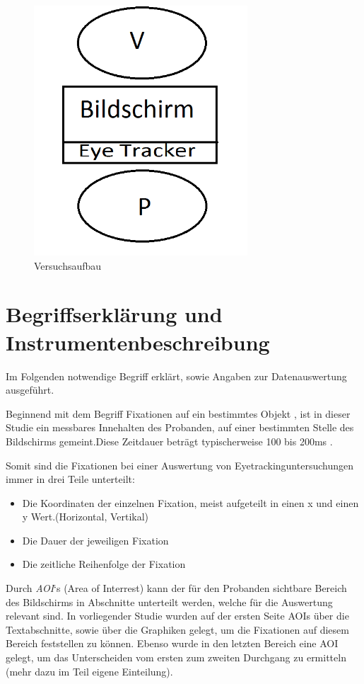 \begin{figure}[H]
\noindent\hspace{0.5mm}\includegraphics[width=8cm]{./Ressourcen/Versuchsaufbau.png}
\caption{Versuchsaufbau}
\end{figure}

\section{Begriffserklärung und Instrumentenbeschreibung}
Im Folgenden notwendige Begriff erklärt, sowie Angaben zur Datenauswertung ausgeführt.


Beginnend mit dem Begriff \grqq Fixationen auf ein bestimmtes Objekt \grqq, ist in dieser Studie ein messbares Innehalten des Probanden, auf einer bestimmten Stelle des Bildschirms gemeint.\grqq Diese Zeitdauer beträgt typischerweise 100 bis 200ms\cite{EyetrackingFixation} .\grqq

Somit sind die Fixationen bei einer Auswertung von Eyetrackinguntersuchungen immer in drei Teile unterteilt:
    \begin{itemize}
        \item Die Koordinaten der einzelnen Fixation, meist aufgeteilt in einen x und einen y Wert.(Horizontal, Vertikal)
        \item Die Dauer der jeweiligen Fixation
        \item Die zeitliche Reihenfolge der Fixation
    \end{itemize}


Durch \textit{AOI}`s (\grqq Area of Interrest\grqq) kann der für den Probanden sichtbare Bereich des Bildschirms in Abschnitte unterteilt werden, welche für die Auswertung relevant sind. In vorliegender Studie wurden auf der ersten Seite AOIs über die Textabschnitte, sowie über die Graphiken gelegt, um die Fixationen auf diesem Bereich feststellen zu können. Ebenso wurde in den letzten Bereich eine AOI gelegt, um das Unterscheiden vom ersten zum zweiten Durchgang zu ermitteln (mehr dazu im Teil eigene Einteilung).

